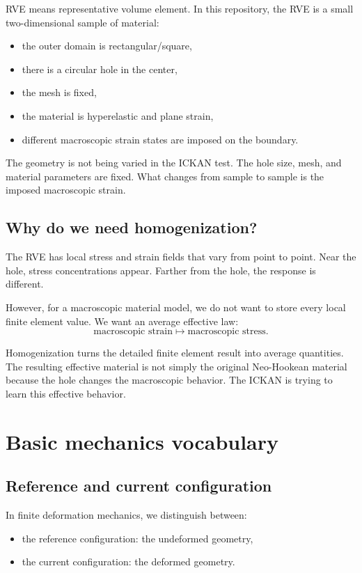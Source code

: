 \documentclass[11pt]{article}
\begin{document}
RVE means representative volume element. In this repository, the RVE is a small
two-dimensional sample of material:

\begin{itemize}[leftmargin=2em]
  \item the outer domain is rectangular/square,
  \item there is a circular hole in the center,
  \item the mesh is fixed,
  \item the material is hyperelastic and plane strain,
  \item different macroscopic strain states are imposed on the boundary.
\end{itemize}

The geometry is not being varied in the ICKAN test. The hole size, mesh, and
material parameters are fixed. What changes from sample to sample is the imposed
macroscopic strain.

\subsection{Why do we need homogenization?}

The RVE has local stress and strain fields that vary from point to point. Near
the hole, stress concentrations appear. Farther from the hole, the response is
different.

However, for a macroscopic material model, we do not want to store every local
finite element value. We want an average effective law:
\[
  \text{macroscopic strain} \longmapsto \text{macroscopic stress}.
\]

Homogenization turns the detailed finite element result into average quantities.
The resulting effective material is not simply the original Neo-Hookean material
because the hole changes the macroscopic behavior. The ICKAN is trying to learn
this effective behavior.

\section{Basic mechanics vocabulary}

\subsection{Reference and current configuration}

In finite deformation mechanics, we distinguish between:

\begin{itemize}[leftmargin=2em]
  \item the reference configuration: the undeformed geometry,
  \item the current configuration: the deformed geometry.
\end{itemize}
\end{document}

